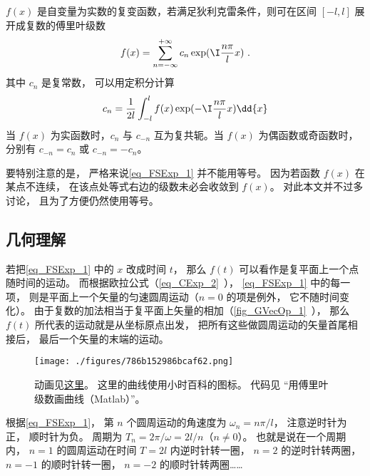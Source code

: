 
$f(x)$ 是自变量为实数的复变函数，若满足狄利克雷条件，则可在区间 $[- l,l]$ 展开成复数的傅里叶级数
\begin{equation}\label{eq_FSExp_1}
f(x) = \sum_{n =  - \infty }^{ + \infty } c_n \exp ( \I\frac{n\pi }{l}x )~.
\end{equation}
其中 $c_n$ 是复常数， 可以用定积分计算
\begin{equation}\label{eq_FSExp_2}
c_n = \frac{1}{2l} \int_{ - l}^l  f(x)\exp( -\I\frac{n\pi }{l}x ) \dd{x} 
\end{equation}
当 $f(x)$ 为实函数时，$c_n$ 与 $c_{-n}$ 互为复共轭。当 $f(x)$ 为偶函数或奇函数时，分别有 $c_{-n} = c_n$ 或 $c_{-n} = -c_n$。

要特别注意的是， 严格来说\autoref{eq_FSExp_1} 并不能用等号。 因为若函数 $f(x)$ 在某点不连续， 在该点处等式右边的级数未必会收敛到 $f(x)$。 对此本文并不过多讨论， 且为了方便仍然使用等号。

\subsection{几何理解}
若把\autoref{eq_FSExp_1} 中的 $x$ 改成时间 $t$， 那么 $f(t)$ 可以看作是复平面上一个点随时间的运动。 而根据欧拉公式（\autoref{eq_CExp_2}~）， \autoref{eq_FSExp_1} 中的每一项， 则是平面上一个矢量的匀速圆周运动（$n=0$ 的项是例外， 它不随时间变化）。 由于复数的加法相当于复平面上矢量的相加（\autoref{fig_GVecOp_1}~）， 那么 $f(t)$ 所代表的运动就是从坐标原点出发， 把所有这些做圆周运动的矢量首尾相接后， 最后一个矢量的末端的运动。

\begin{figure}[ht]
\centering
\texttt{[image: ./figures/786b152986bcaf62.png]}
\caption{动画见\href{https://wuli.wiki/apps/FFTplt.html}{这里}。 这里的曲线使用小时百科的图标。 代码见 “用傅里叶级数画曲线（Matlab）”。} \label{fig_FSExp_1}
\end{figure}

根据\autoref{eq_FSExp_1}， 第 $n$ 个圆周运动的角速度为 $\omega_n = n\pi/l$， 注意逆时针为正， 顺时针为负。 周期为 $T_n = 2\pi/\omega = 2l/n$（$n\ne 0$）。 也就是说在一个周期内， $n=1$ 的圆周运动在时间 $T = 2l$ 内逆时针转一圈， $n=2$ 的逆时针转两圈， $n=-1$ 的顺时针转一圈， $n=-2$ 的顺时针转两圈……

